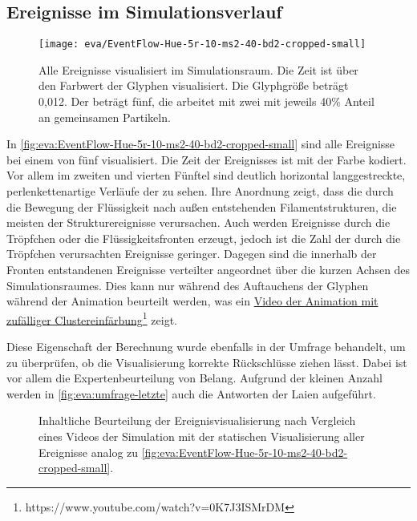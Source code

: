 \subsection*{Ereignisse im Simulationsverlauf}\label{sec:eva:ereignisse-quali-verlauf}

\begin{figure}
	\texttt{[image: eva/EventFlow-Hue-5r-10-ms2-40-bd2-cropped-small]}
	\caption{Alle Ereignisse visualisiert im Simulationsraum. Die Zeit ist über den Farbwert der Glyphen visualisiert. Die Glyphgröße beträgt 0,012. Der  beträgt fünf, die  arbeitet mit zwei  mit jeweils 40\% Anteil an gemeinsamen Partikeln.}\label{fig:eva:EventFlow-Hue-5r-10-ms2-40-bd2-cropped-small}
\end{figure}

In \autoref{fig:eva:EventFlow-Hue-5r-10-ms2-40-bd2-cropped-small} sind alle Ereignisse bei einem  von fünf visualisiert. Die Zeit der Ereignisses ist mit der Farbe kodiert. Vor allem im zweiten und vierten Fünftel sind deutlich horizontal langgestreckte, perlenkettenartige Verläufe der  zu sehen. Ihre Anordnung zeigt, dass die durch die Bewegung der Flüssigkeit nach außen entstehenden Filamentstrukturen, die meisten der Strukturereignisse verursachen. Auch werden Ereignisse durch die Tröpfchen oder die Flüssigkeitsfronten erzeugt, jedoch ist die Zahl der durch die Tröpfchen verursachten Ereignisse geringer. Dagegen sind die innerhalb der Fronten entstandenen Ereignisse verteilter angeordnet über die kurzen Achsen des Simulationsraumes. Dies kann nur während des Auftauchens der Glyphen während der Animation beurteilt werden, was ein \href{https://www.youtube.com/watch?v=0K7J3ISMrDM}{Video der Animation mit zufälliger Clustereinfärbung}\footnote{https://www.youtube.com/watch?v=0K7J3ISMrDM} zeigt.

Diese Eigenschaft der Berechnung wurde ebenfalls in der Umfrage behandelt, um zu überprüfen, ob die Visualisierung korrekte Rückschlüsse ziehen lässt. Dabei ist vor allem die Expertenbeurteilung von Belang. Aufgrund der kleinen Anzahl werden in \autoref{fig:eva:umfrage-letzte} auch die Antworten der Laien aufgeführt.

\begin{figure}
	{\caption{Inhaltliche Beurteilung der Ereignisvisualisierung nach Vergleich eines Videos der Simulation mit der statischen Visualisierung aller Ereignisse analog zu \autoref{fig:eva:EventFlow-Hue-5r-10-ms2-40-bd2-cropped-small}.}\label{fig:eva:umfrage-letzte}}
\end{figure}

